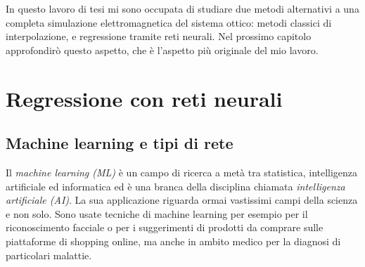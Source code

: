 \documentclass[12pt,a4paper,final]{book}
\begin{document}
In questo lavoro di tesi mi sono occupata di studiare due metodi alternativi a una completa simulazione elettromagnetica del sistema ottico: metodi classici di interpolazione, e regressione tramite reti neurali. Nel prossimo capitolo approfondirò questo aspetto, che è l'aspetto più originale del mio lavoro.




\chapter{Regressione con reti neurali}\label{reg_nn}


\section{Machine learning e tipi di rete}
Il \textit{machine learning (ML)} è un campo di ricerca a metà tra statistica, intelligenza artificiale ed informatica ed è una branca della disciplina chiamata \textit{intelligenza artificiale (AI)}. La sua applicazione riguarda ormai vastissimi campi della scienza e non solo. Sono usate tecniche di machine learning per esempio per il riconoscimento facciale o per i suggerimenti di prodotti da comprare sulle piattaforme di shopping online, ma anche in ambito medico per la diagnosi di particolari malattie.
\end{document}
